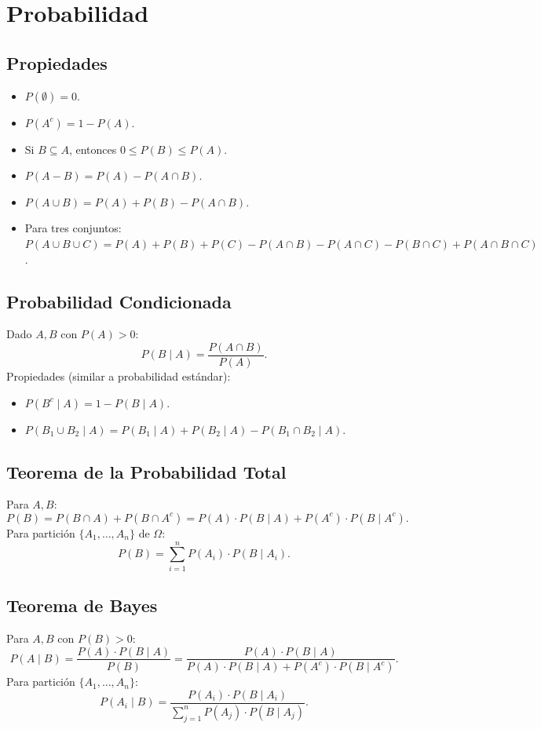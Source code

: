 \documentclass{article}
\begin{document}
\section{Probabilidad}

\subsection{Propiedades}
\begin{itemize}
    \item \(P(\emptyset) = 0\).
    \item \(P(A^c) = 1 - P(A)\).
    \item Si \(B \subseteq A\), entonces \(0 \leq P(B) \leq P(A)\).
    \item \(P(A - B) = P(A) - P(A \cap B)\).
    \item \(P(A \cup B) = P(A) + P(B) - P(A \cap B)\).
    \item Para tres conjuntos: \(P(A \cup B \cup C) = P(A) + P(B) + P(C) - P(A \cap B) - P(A \cap C) - P(B \cap C) + P(A \cap B \cap C)\).
\end{itemize}

\subsection{Probabilidad Condicionada}
Dado \(A, B\) con \(P(A) > 0\):
\[
P(B \mid A) = \frac{P(A \cap B)}{P(A)}.
\]
Propiedades (similar a probabilidad estándar):
\begin{itemize}
    \item \(P(B^c \mid A) = 1 - P(B \mid A)\).
    \item \(P(B_1 \cup B_2 \mid A) = P(B_1 \mid A) + P(B_2 \mid A) - P(B_1 \cap B_2 \mid A)\).
\end{itemize}

\subsection{Teorema de la Probabilidad Total}
Para \(A, B\):
\[
P(B) = P(B \cap A) + P(B \cap A^c) = P(A) \cdot P(B \mid A) + P(A^c) \cdot P(B \mid A^c).
\]
Para partición \(\{A_1, \dots, A_n\}\) de \(\Omega\):
\[
P(B) = \sum_{i=1}^n P(A_i) \cdot P(B \mid A_i).
\]

\subsection{Teorema de Bayes}
Para \(A, B\) con \(P(B) > 0\):
\[
P(A \mid B) = \frac{P(A) \cdot P(B \mid A)}{P(B)} = \frac{P(A) \cdot P(B \mid A)}{P(A) \cdot P(B \mid A) + P(A^c) \cdot P(B \mid A^c)}.
\]
Para partición \(\{A_1, \dots, A_n\}\):
\[
P(A_i \mid B) = \frac{P(A_i) \cdot P(B \mid A_i)}{\sum_{j=1}^n P(A_j) \cdot P(B \mid A_j)}.
\]
\end{document}
